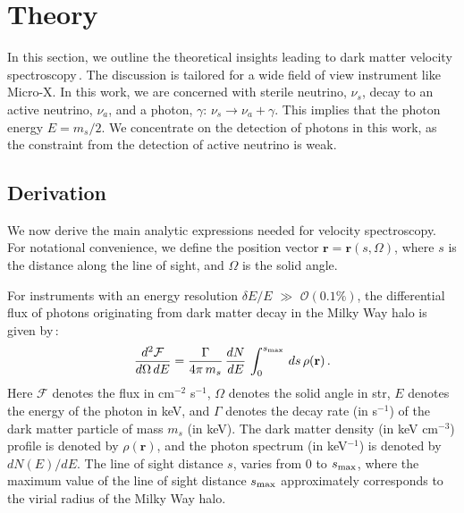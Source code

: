 \documentclass[aps,prd,10pt,twocolumn,superscriptaddress,showpacs]{revtex4-1}
\newcommand{\br}[0]{\mathbf{r}}
\begin{document}

\section{Theory}
\label{sec:theory}

In this section, we outline the theoretical insights leading to dark matter velocity spectroscopy\,\cite{speckhard2016}.  
The discussion is tailored for a wide field of view instrument like Micro-X.  In this work, we are concerned with sterile neutrino, 
$\nu_s$, decay to an active neutrino, $\nu_a$, and a photon, $\gamma$: $\nu_s \rightarrow \nu_a + \gamma$.  
This implies that the photon energy $E = m_s/2$.  We concentrate on the detection of photons in this work, as the constraint from the detection of active neutrino is weak.

\subsection{Derivation}
\label{sec:derivation}

We now derive the main analytic expressions needed for velocity spectroscopy. For notational
convenience, we define the position vector $\br=\br(s, \Omega)$, where $s$ is the distance
along the line of sight, and $\Omega$ is the solid angle.

For instruments with an energy resolution $\delta E/E$ $\gg$ $\mathcal{O} (0.1\%)$, the differential flux of photons originating from dark matter decay in the Milky Way halo is given by\,\cite{Figueroa-Feliciano:2015gwa}:
\begin{eqnarray}
\dfrac{d^2 \mathcal{F}}{d\Omega \, dE} =  \dfrac{\Gamma}{4\pi \, m_s} \, \dfrac{dN}{dE} \, \int
_0 ^{s_{\rm max}}  \, ds \, \rho(\br)  \,.
\label{eq:double differential for the flux}
\end{eqnarray}
Here $\mathcal{F}$ denotes the flux in cm$^{-2}$ s$^{-1}$, $\Omega$ denotes the solid angle in str,
$E$ denotes the energy of the photon in keV, and $\Gamma$ denotes the decay rate (in s$^{-1}$) of
the dark matter particle of mass $m_s$ (in keV).  The dark matter density (in keV cm$^{-3}$) profile
is denoted by $\rho(\br)$, and the photon spectrum (in keV$^{-1}$) is denoted by $dN(E)/dE$.  The line of sight distance $s$, varies from 0 to $s_{\rm max}$, where the maximum value of the line of sight distance $s_{\rm max}$ approximately corresponds to the virial radius of the Milky Way halo.
\end{document}
